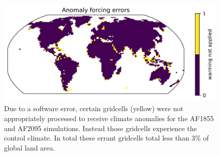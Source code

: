 \documentclass[11pt]{article}
\begin{document}
\begin{figure}[h]
\centering
\includegraphics[width=\textwidth]{../figs/supp/anomaly_errors.png}
\caption{Due to a software error, certain gridcells (yellow) were not appropriately processed to receive climate anomalies for the AF1855 and AF2095 simulations. Instead those gridcells experience the control climate. In total these errant gridcells total less than 3\% of global land area.  }
\label{supp:abug}
\end{figure}
\end{document}

